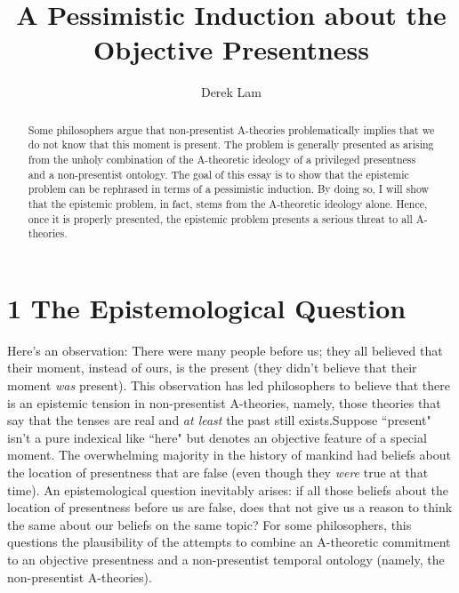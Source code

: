 \documentclass[a4paper,12pt]{article}
\title{A Pessimistic Induction about the Objective Presentness}
\author{Derek Lam}
\begin{document}
\maketitle

\begin{abstract}
Some philosophers argue that non-presentist A-theories problematically implies that we do not know that this moment is present. The problem is generally presented as arising from the unholy combination of the A-theoretic ideology of a privileged presentness and a non-presentist ontology. The goal of this essay is to show that the epistemic problem can be rephrased in terms of a pessimistic induction. By doing so, I will show that the epistemic problem, in fact, stems from the A-theoretic ideology alone. Hence, once it is properly presented, the epistemic problem presents a serious threat to all A-theories.
\end{abstract}

\section*{1 The Epistemological Question}

Here's an observation: There were many people before us; they all believed that their moment, instead of ours, is the present (they didn't believe that their moment \emph{was} present). This observation has led philosophers to believe that there is an epistemic tension in non-presentist A-theories, namely, those theories that say that the tenses are real and \emph{at least} the past still exists.\footnotemark Suppose ``present" isn't a pure indexical like ``here" but denotes an objective feature of a special moment. The overwhelming majority in the history of mankind had beliefs about the location of presentness that are false (even though they \emph{were} true at that time). An epistemological question inevitably arises: if all those beliefs about the location of presentness before us are false, does that not give us a reason to think the same about our beliefs on the same topic? For some philosophers, this questions the plausibility of the attempts to combine an A-theoretic commitment to an objective presentness and a non-presentist temporal ontology (namely, the non-presentist A-theories).

\end{document}
